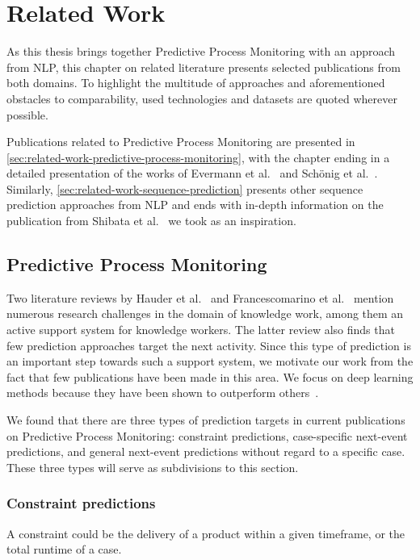 \chapter{Related Work}\label{chap:related-work}
As this thesis brings together Predictive Process Monitoring with an approach from NLP, this chapter on related literature presents selected publications from both domains. To highlight the multitude of approaches and aforementioned obstacles to comparability, used technologies and datasets are quoted wherever possible.

Publications related to Predictive Process Monitoring are presented in \autoref{sec:related-work-predictive-process-monitoring}, with the chapter ending in a detailed presentation of the works of Evermann et al.~\cite{evermann2016} and Schönig et al.~\cite{schoenig2018}. Similarly, \autoref{sec:related-work-sequence-prediction} presents other sequence prediction approaches from NLP and ends with in-depth information on the publication from Shibata et al.~\cite{shibata2016bipartite} we took as an inspiration.

\section{Predictive Process Monitoring}
\label{sec:related-work-predictive-process-monitoring}
Two literature reviews by Hauder et al.~\cite{hauder2014} and Francescomarino et al.~\cite{francescomarino2018} mention numerous research challenges in the domain of knowledge work, among them an active support system for knowledge workers. The latter review also finds that few prediction approaches target the next activity. Since this type of prediction is an important step towards such a support system, we motivate our work from the fact that few publications have been made in this area. We focus on deep learning methods because they have been shown to outperform others~\cite{tax2018interdisciplinary}.

We found that there are three types of prediction targets in current publications on Predictive Process Monitoring: constraint predictions, case-specific next-event predictions, and general next-event predictions without regard to a specific case. These three types will serve as subdivisions to this section.

\subsection*{Constraint predictions}
A constraint could be the delivery of a product within a given timeframe, or the total runtime of a case.

